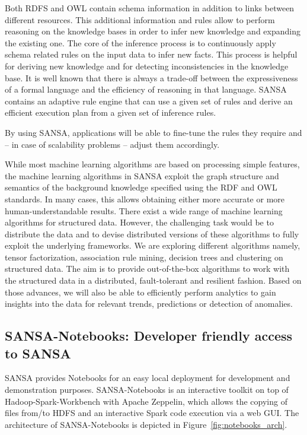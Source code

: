 Both \gls{RDFS} and \gls{OWL} contain schema information in addition to links between different resources. 
This additional information and rules allow to perform reasoning on the knowledge bases in order to infer new knowledge and expanding the existing one. 
The core of the inference process is to continuously apply schema related rules on the input data to infer new facts. 
This process is helpful for deriving new knowledge and for detecting inconsistencies in the knowledge base.
It is well known that there is always a trade-off between the expressiveness of a formal language and the efficiency of reasoning in that language. 
SANSA contains an adaptive rule engine that can use a given set of rules and derive an efficient execution plan from a given set of inference rules.

By using SANSA, applications will be able to fine-tune the rules they require and -- in case of scalability problems -- adjust them accordingly.

While most machine learning algorithms are based on processing simple features, the machine learning algorithms in SANSA exploit the graph structure and semantics of the background knowledge specified using the \gls{RDF} and \gls{OWL} standards. 
In many cases, this allows obtaining either more accurate or more human-understandable results.
There exist a wide range of machine learning algorithms for structured data. 
However, the challenging task would be to distribute the data and to devise distributed versions of these algorithms to fully exploit the underlying frameworks. 
We are exploring different algorithms namely, tensor factorization, association rule mining, decision trees and clustering on structured data. 
The aim is to provide out-of-the-box algorithms to work with the structured data in a distributed, fault-tolerant and resilient fashion.
Based on those advances, we will also be able to efficiently perform analytics to gain insights into the data for relevant trends, predictions or detection of anomalies.

\subsection{SANSA-Notebooks: Developer friendly access to SANSA}
SANSA provides Notebooks for an easy local deployment for development and demonstration purposes.
SANSA-Notebooks is an interactive toolkit on top of Hadoop-Spark-Workbench with Apache Zeppelin, which allows the copying of files from/to \gls{HDFS} and an interactive Spark code execution via a web GUI.
The architecture of SANSA-Notebooks is depicted in Figure~\ref{fig:notebooks_arch}.

